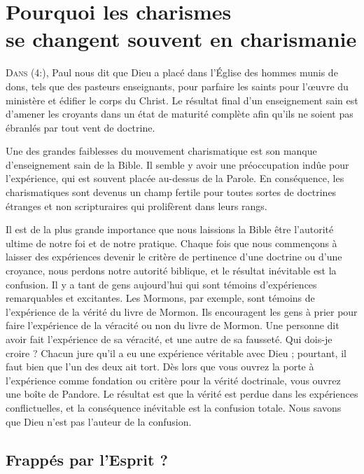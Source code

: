 \chapter[Pourquoi les charismes se changent souvent en charismanie]{Pourquoi les charismes\\ se changent souvent en charismanie}
\renewcommand{\chaphead}{\textls[0]{Pourquoi les charismes se changent souvent en charismanie}}

\lettrine{D}{ans (4:),}
 Paul nous dit que Dieu a placé dans l'Église
 des hommes munis de dons, tels que des pasteurs enseignants,
 pour parfaire les saints pour l'œuvre du ministère et édifier le corps
 du Christ. Le résultat final d'un enseignement sain est d'amener
 les croyants dans un état de maturité complète afin qu'ils ne soient
 pas ébranlés par tout vent de doctrine.

Une des grandes faiblesses du mouvement charismatique est son manque
 d'enseignement sain de la Bible. Il semble y avoir une préoccupation
 indûe pour l'expérience, qui est souvent placée au-dessus de la Parole.
 En conséquence, les charismatiques sont devenus un champ fertile
 pour toutes sortes de doctrines étranges et non scripturaires qui prolifèrent
 dans leurs rangs.

Il est de la plus grande importance que nous laissions la Bible être
 l'autorité ultime de notre foi et de notre pratique.
 Chaque fois que nous commençons à laisser des expériences
 devenir le critère de pertinence d'une doctrine ou d'une croyance,
 nous perdons notre autorité biblique, et le résultat inévitable
 est la confusion. Il y a tant de gens aujourd'hui qui sont témoins
 d'expériences remarquables et excitantes. Les Mormons, par exemple,
 \og sont témoins \fg{} de l'expé\-rience de la vérité du livre de Mormon.
 Ils encouragent les gens à prier pour faire l'expérience de la véracité
 ou non du livre de Mormon. Une personne dit avoir fait l'expérience
 de sa véracité, et une autre de sa fausseté. Qui dois-je croire ?
 Chacun jure qu'il a eu une expérience véritable avec Dieu ;
 pourtant, il faut bien que l'un des deux ait tort.
 Dès lors que vous ouvrez la porte à l'expérience comme fondation
 ou critère pour la vérité doctrinale, vous ouvrez une boîte de Pandore.
 Le résultat est que la vérité est perdue dans les expériences
 conflictuelles, et la conséquence inévitable est la confusion totale.
 Nous savons que Dieu n'est pas l'auteur de la confusion.


\section{Frapp\'es par l'Esprit ?}

